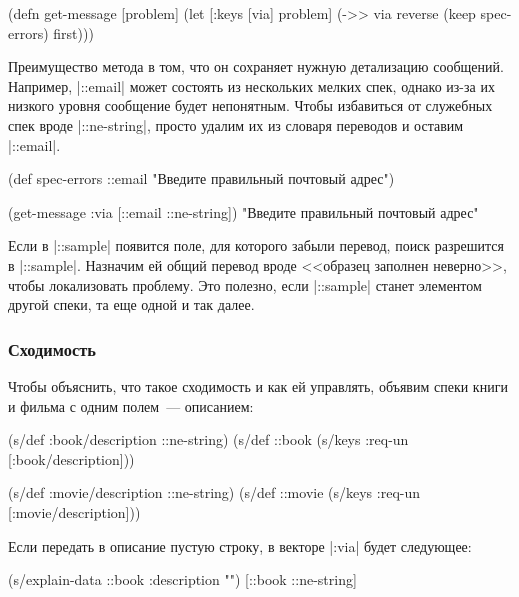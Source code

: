 \begin{english}
  \begin{clojure}
(defn get-message
  [problem]
  (let [{:keys [via]} problem]
    (->> via
         reverse
         (keep spec-errors)
         first)))
  \end{clojure}
\end{english}

Преимущество метода в том, что он сохраняет нужную детализацию
сообщений. Например, \spverb|::email| может состоять из нескольких мелких спек,
однако из-за их низкого уровня сообщение будет непонятным. Чтобы избавиться от
служебных спек вроде \spverb|::ne-string|, просто удалим их из словаря переводов
и оставим \spverb|::email|.

  \begin{clojure}
(def spec-errors
  {::email "Введите правильный почтовый адрес"})

(get-message {:via [::email ::ne-string]})
"Введите правильный почтовый адрес"
  \end{clojure}

Если в \spverb|::sample| появится поле, для которого забыли перевод, поиск
разрешится в \spverb|::sample|. Назначим ей общий перевод вроде <<образец
заполнен неверно>>, чтобы локализовать проблему. Это полезно, если
\spverb|::sample| станет элементом другой спеки, та еще одной и так далее.

\subsubsection{Сходимость}

Чтобы объяснить, что такое сходимость и как ей управлять, объявим спеки книги и
фильма с одним полем~--- описанием:

\begin{english}
  \begin{clojure}
(s/def :book/description ::ne-string)
(s/def ::book (s/keys :req-un [:book/description]))

(s/def :movie/description ::ne-string)
(s/def ::movie (s/keys :req-un [:movie/description]))
  \end{clojure}
\end{english}

Если передать в описание пустую строку, в векторе \spverb|:via| будет следующее:

\begin{english}
  \begin{clojure}
(s/explain-data ::book {:description ""})
[::book ::ne-string]
  \end{clojure}
\end{english}

